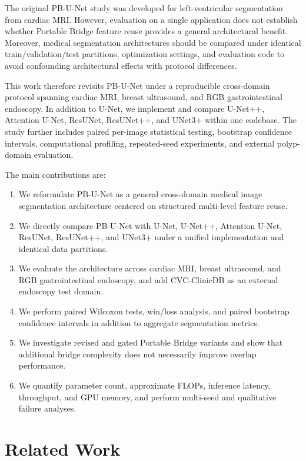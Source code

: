 \documentclass[11pt]{article}
\begin{document}
The original PB-U-Net study was developed for left-ventricular segmentation from cardiac MRI. However, evaluation on a single application does not establish whether Portable Bridge feature reuse provides a general architectural benefit. Moreover, medical segmentation architectures should be compared under identical train/validation/test partitions, optimization settings, and evaluation code to avoid confounding architectural effects with protocol differences.

This work therefore revisits PB-U-Net under a reproducible cross-domain protocol spanning cardiac MRI, breast ultrasound, and RGB gastrointestinal endoscopy. In addition to U-Net, we implement and compare U-Net++, Attention U-Net, ResUNet, ResUNet++, and UNet3+ within one codebase. The study further includes paired per-image statistical testing, bootstrap confidence intervals, computational profiling, repeated-seed experiments, and external polyp-domain evaluation.

The main contributions are:
\begin{enumerate}[leftmargin=*]
    \item We reformulate PB-U-Net as a general cross-domain medical image segmentation architecture centered on structured multi-level feature reuse.
    \item We directly compare PB-U-Net with U-Net, U-Net++, Attention U-Net, ResUNet, ResUNet++, and UNet3+ under a unified implementation and identical data partitions.
    \item We evaluate the architecture across cardiac MRI, breast ultrasound, and RGB gastrointestinal endoscopy, and add CVC-ClinicDB as an external endoscopy test domain.
    \item We perform paired Wilcoxon tests, win/loss analysis, and paired bootstrap confidence intervals in addition to aggregate segmentation metrics.
    \item We investigate revised and gated Portable Bridge variants and show that additional bridge complexity does not necessarily improve overlap performance.
    \item We quantify parameter count, approximate FLOPs, inference latency, throughput, and GPU memory, and perform multi-seed and qualitative failure analyses.
\end{enumerate}

\section{Related Work}
\end{document}
